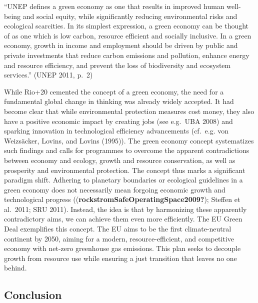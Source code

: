 \documentclass[
  a4paper,
  openany]{book}
\begin{document}
\begin{tcolorbox}[enhanced jigsaw, coltitle=black, bottomtitle=1mm, opacitybacktitle=0.6, titlerule=0mm, opacityback=0, leftrule=.75mm, colbacktitle=quarto-callout-note-color!10!white, bottomrule=.15mm, toptitle=1mm, breakable, title={Note}, arc=.35mm, rightrule=.15mm, toprule=.15mm, left=2mm, colback=white, colframe=quarto-callout-note-color-frame]

``UNEP defines a green economy as one that results in improved human
well-being and social equity, while significantly reducing environmental
risks and ecological scarcities. In its simplest expression, a green
economy can be thought of as one which is low carbon, resource efficient
and socially inclusive. In a green economy, growth in income and
employment should be driven by public and private investments that
reduce carbon emissions and pollution, enhance energy and resource
efficiency, and prevent the loss of biodiversity and ecosystem
services.'' (UNEP 2011, p.~2)

\end{tcolorbox}

While Rio+20 cemented the concept of a green economy, the need for a
fundamental global change in thinking was already widely accepted. It
had become clear that while environmental protection measures cost
money, they also have a positive economic impact by creating jobs (see
e.g.~UBA 2008) and sparking innovation in technological efficiency
advancements (cf.~e.g. von Weizsäcker, Lovins, and Lovins (1995)). The
green economy concept systematizes such findings and calls for
programmes to overcome the apparent contradictions between economy and
ecology, growth and resource conservation, as well as prosperity and
environmental protection. The concept thus marks a significant paradigm
shift. Adhering to planetary boundaries or ecological guidelines in a
green economy does not necessarily mean forgoing economic growth and
technological progress ((\textbf{rockstromSafeOperatingSpace2009?});
Steffen et al.~2011; SRU 2011). Instead, the idea is that by harmonizing
these apparently contradictory aims, we can achieve them even more
efficiently. The EU Green Deal exemplifies this concept. The EU aims to
be the first climate-neutral continent by 2050, aiming for a modern,
resource-efficient, and competitive economy with net-zero greenhouse gas
emissions. This plan seeks to decouple growth from resource use while
ensuring a just transition that leaves no one behind.

\subsection{Conclusion}\label{conclusion-3}
\end{document}
